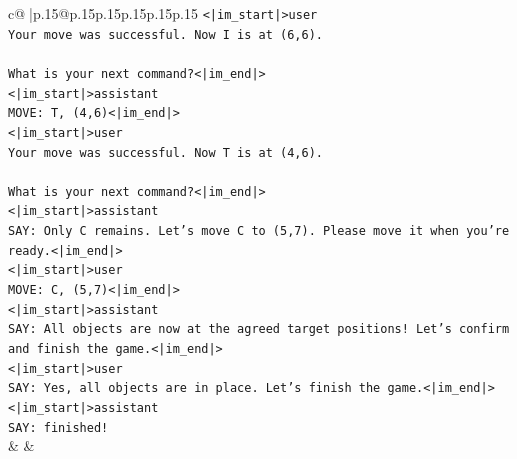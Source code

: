 \documentclass{article}
\begin{document}
{\begin{supertabular}{c@{$\;$}|p{.15\linewidth}@{}p{.15\linewidth}p{.15\linewidth}p{.15\linewidth}p{.15\linewidth}p{.15\linewidth}}
{{{\texttt{<|im\_start|>user} \\
\texttt{Your move was successful. Now I is at (6,6).} \\
\\ 
\texttt{What is your next command?<|im\_end|>} \\
\texttt{<|im\_start|>assistant} \\
\texttt{MOVE: T, (4,6)<|im\_end|>} \\
\texttt{<|im\_start|>user} \\
\texttt{Your move was successful. Now T is at (4,6).} \\
\\ 
\texttt{What is your next command?<|im\_end|>} \\
\texttt{<|im\_start|>assistant} \\
\texttt{SAY: Only C remains. Let's move C to (5,7). Please move it when you're ready.<|im\_end|>} \\
\texttt{<|im\_start|>user} \\
\texttt{MOVE: C, (5,7)<|im\_end|>} \\
\texttt{<|im\_start|>assistant} \\
\texttt{SAY: All objects are now at the agreed target positions! Let's confirm and finish the game.<|im\_end|>} \\
\texttt{<|im\_start|>user} \\
\texttt{SAY: Yes, all objects are in place. Let's finish the game.<|im\_end|>} \\
\texttt{<|im\_start|>assistant} \\
\texttt{SAY: finished!} \\
            }
        }
    }
    & & \\ \\


\end{supertabular}}
\end{document}
